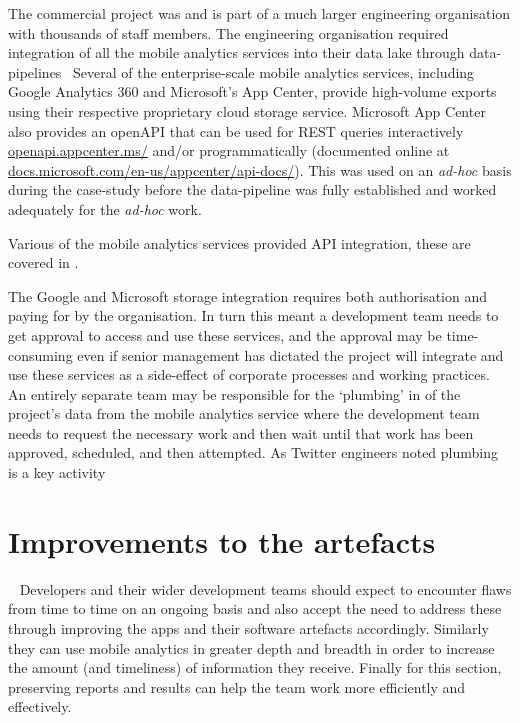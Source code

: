 The commercial project was and is part of a much larger engineering organisation with thousands of staff members. The engineering organisation required integration of all the mobile analytics services into their data lake through data-pipelines~ Several of the enterprise-scale mobile analytics services, including Google Analytics 360 and Microsoft's App Center, provide high-volume exports using their respective proprietary cloud storage service. Microsoft App Center also provides an openAPI that can be used for REST queries interactively \href{https://openapi.appcenter.ms/}{openapi.appcenter.ms/} and/or programmatically (documented online at \href{https://docs.microsoft.com/en-us/appcenter/api-docs/}{docs.microsoft.com/en-us/appcenter/api-docs/}). This was used on an \emph{ad-hoc} basis during the case-study before the data-pipeline was fully established and worked adequately for the \emph{ad-hoc} work.  

Various of the mobile analytics services provided API integration, these are covered in .

The Google and Microsoft storage integration requires both authorisation and paying for by the organisation. In turn this meant a development team needs to get approval to access and use these services, and the approval may be time-consuming even if senior management has dictated the project will integrate and use these services as a side-effect of corporate processes and working practices. An entirely separate team may be responsible for the `plumbing' in of the project's data from the mobile analytics service where the development team needs to request the necessary work and then wait until that work has been approved, scheduled, and then attempted. As Twitter engineers noted plumbing is a key activity~ 


\section{Improvements to  the artefacts}~\label{aata-improvements-to-theartefacts}\index{\iartefacts}
Developers and their wider development teams should expect to encounter flaws from time to time on an ongoing basis and also accept the need to address these through improving the apps and their software artefacts accordingly. Similarly they can use mobile analytics in greater depth and breadth in order to increase the amount (and timeliness) of information they receive. Finally for this section, preserving reports and results can help the team work more efficiently and effectively.

